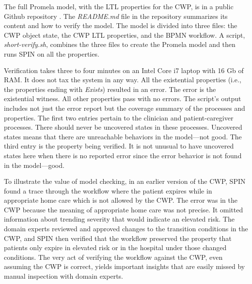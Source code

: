 The full Promela model, with the LTL properties for the CWP, is in a public Github repository \cite{repo}. The \emph{README.md} file in the repository summarizes its content and how to verify the model. The model is divided into three files: the CWP object state, the CWP LTL properties, and the BPMN workflow. A script, \emph{short-verify.sh}, combines the three files to create the Promela model and then runs SPIN on all the properties.

\begin{comment}
\begin{figure*}[t]
  \begin{center}
    \begin{tabular}{c}
      \texttt{[image: ../figs/proof-digest.png]}
    \end{tabular}
  \end{center}
\caption{Some of the verification results from the SPIN model checker.}
\label{fig:proof}
\end{figure*}
The results for the state properties for \texttt{ptInElevatedRiskHomeCare} with the measured time verifying the entire model is shown in \figref{fig:proof}.
\end{comment}

Verification takes three to four minutes on an Intel Core i7 laptop with 16 Gb of RAM. It does not tax the system in any way.
All the existential properties (i.e., the properties ending with \emph{Exists}) resulted in an error. The error is the existential witness.
All other properties pass with no errors. The script's output includes not just the error report but the coverage summary of the processes and properties.
The first two entries pertain to the clinician and patient-caregiver processes. There should never be uncovered states in these processes.
Uncovered states means that there are unreachable behaviors in the model---not good. The third entry is the property being verified.
It is not unusual to have uncovered states here when there is no reported error since the error behavior is not found in the model---good.

To illustrate the value of model checking, in an earlier version of the CWP, SPIN found a trace through the workflow where the patient expires while in appropriate home care which is not allowed by the CWP. The error was in the CWP because the meaning of appropriate home care was not precise. It omitted information about trending severity that would indicate an elevated risk. The domain experts reviewed and approved changes to the transition conditions in the CWP, and SPIN then verified that the workflow preserved the property that patients only expire in elevated risk or in the hospital under those changed conditions. The very act of verifying the workflow against the CWP, even assuming the CWP is correct, yields important insights that are easily missed by manual inspection with domain experts.